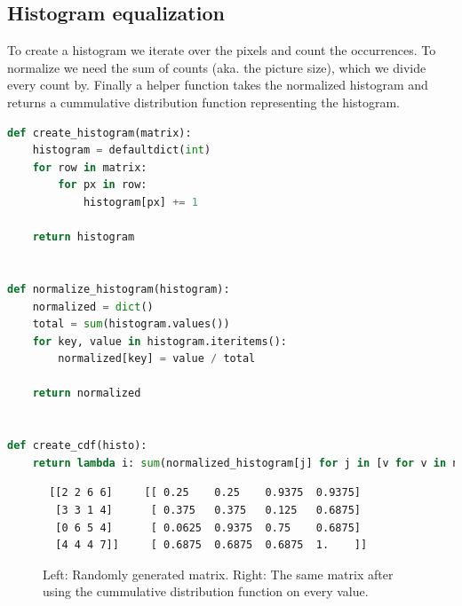 \clearpage
\subsection*{Histogram equalization}

To create a histogram we iterate over the pixels and count the occurrences.
To normalize we need the sum of counts (aka. the picture size), which we divide every count by.
Finally a helper function takes the normalized histogram and returns a cummulative distribution function representing the histogram.

\begin{lstlisting}[language=Python, label=input_range, caption=Input range stretching]
def create_histogram(matrix):
    histogram = defaultdict(int)
    for row in matrix:
        for px in row:
            histogram[px] += 1

    return histogram


def normalize_histogram(histogram):
    normalized = dict()
    total = sum(histogram.values())
    for key, value in histogram.iteritems():
        normalized[key] = value / total

    return normalized


def create_cdf(histo):
    return lambda i: sum(normalized_histogram[j] for j in [v for v in normalized_histogram.keys() if v <= i])
\end{lstlisting}

\begin{figure}[h!]
    \centering
 \begin{verbatim}
 [[2 2 6 6]     [[ 0.25    0.25    0.9375  0.9375]
  [3 3 1 4]      [ 0.375   0.375   0.125   0.6875]
  [0 6 5 4]      [ 0.0625  0.9375  0.75    0.6875]
  [4 4 4 7]]     [ 0.6875  0.6875  0.6875  1.    ]]
 \end{verbatim}
 \caption{Left: Randomly generated matrix. Right: The same matrix after using the cummulative distribution function on every value.}
\end{figure}



